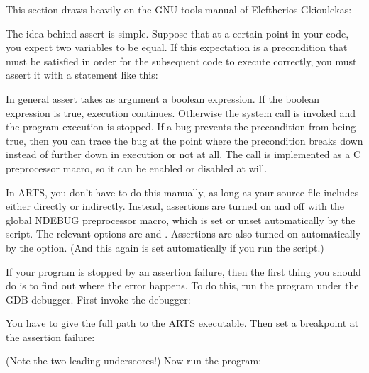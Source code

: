 \label{sec:development:assert}
 
This section draws heavily on the GNU tools manual of Eleftherios
Gkioulekas:
\begin{quote}
{\footnotesize
{}}
\end{quote}

The idea behind assert is simple. Suppose that at a certain point in
your code, you expect two variables to be equal.  If this expectation
is a precondition that must be satisfied in order for the subsequent
code to execute correctly, you must assert it with a statement like
this:
\begin{quote}
\end{quote}

In general assert takes as argument a boolean expression. If the
boolean expression is true, execution continues. Otherwise the
 system call is invoked and the program execution is
stopped. If a bug prevents the precondition from being true, then you
can trace the bug at the point where the precondition breaks down
instead of further down in execution or not at all.  The  call
is implemented as a C preprocessor macro, so it can be enabled or
disabled at will. 

In ARTS, you don't have to do this manually, as long as your source
file includes  either directly or indirectly.
Instead, assertions are turned on and off with the global NDEBUG
preprocessor macro, which is set or unset automatically by the
 script. The relevant 
options are  and
. Assertions are also turned on
automatically by the  option. (And
this again is set automatically if you run the 
script.)

If your program is stopped by an assertion failure, then the first
thing you should do is to find out where the error happens. To do
this, run the program under the GDB debugger. First invoke
the debugger:
\begin{quote}
\end{quote}
You have to give the full path to the ARTS executable.  Then set a
breakpoint at the assertion failure:
\begin{quote}
\end{quote}
(Note the two leading underscores!) Now run the program: 
\begin{quote}
\end{quote}


